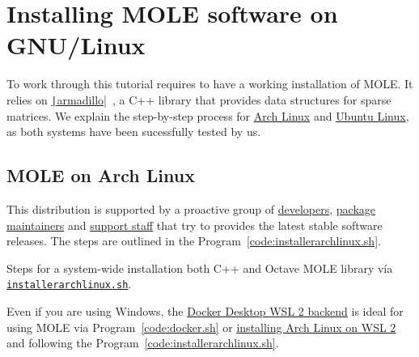 \appendix

\chapter{Installing MOLE software on GNU/Linux}

To work through this tutorial requires to have a working installation
of MOLE.
It relies on
\href{https://gitlab.com/conradsnicta/armadillo-code}{\texttt|armadillo|}~\cite{Sanderson2025},
a C++ library that provides data structures for sparse matrices.
We explain the step-by-step process for
\href{https://wiki.archlinux.org/title/Pacman/Rosetta}{Arch Linux}
and \href{https://help.ubuntu.com/lts/ubuntu-help/index.html}{Ubuntu Linux},
as both systems have been sucessfully tested by us.

\section{MOLE on Arch Linux}

This distribution is supported by a proactive group of
\href{https://archlinux.org/people/developers}{developers},
\href{https://archlinux.org/people/package-maintainers}{package maintainers}
and \href{https://archlinux.org/people/support-staff}{support staff}
that try to provides the latest stable software releases.
The steps are outlined in the Program~\ref{code:installerarchlinux.sh}.

\begin{listing}[ht!]
	\tiny
	\centering
	\caption{Steps for a system-wide installation both C++ and Octave
		MOLE library vía
		\href{https://raw.githubusercontent.com/carlosal1015/mole_examples/main/tutorial/installerarchlinux.sh}{\texttt{installerarchlinux.sh}}.}
	\label{code:installerarchlinux.sh}
\end{listing}

Even if you are using Windows, the
\href{https://docs.docker.com/desktop/features/wsl}{Docker Desktop WSL 2 backend}
is ideal for using MOLE via Program~\ref{code:docker.sh} or
\href{https://wiki.archlinux.org/title/Install_Arch_Linux_on_WSL}{installing Arch Linux on WSL 2} and following
the Program~\ref{code:installerarchlinux.sh}.

